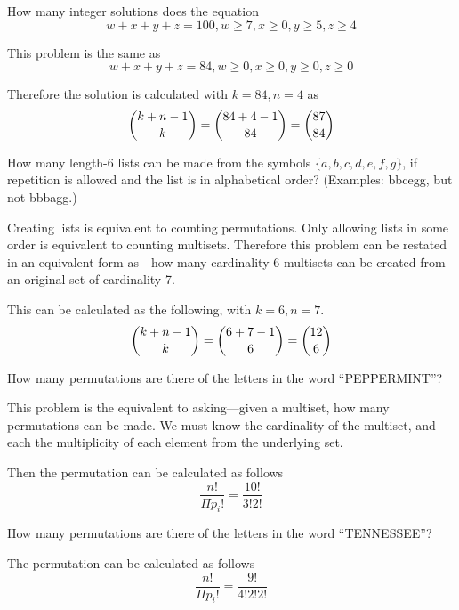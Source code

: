 \documentclass[openany, 11pt]{book}
\begin{document}
\begin{exercise}{}{}
	How many integer solutions does the equation
	$$w + x + y+ z = 100, w \geq 7, x \geq 0, y \geq 5, z \geq 4$$
	\begin{alist}
		\item This problem is the same as
		$$w + x + y+ z = 84, w \geq 0, x \geq 0, y \geq 0, z \geq 0$$
		\item Therefore the solution is calculated with $k=84, n=4$ as
		$$ \dbinom{k+n-1}{k} = \dbinom{84+4-1}{84}=\dbinom{87}{84}$$
	\end{alist}
\end{exercise}

\begin{exercise}{}{}
	How many length-6 lists can be made from the symbols $\{a,
		b, c, d, e, f, g\}$, if repetition is allowed and the list is in
	alphabetical order? (Examples: bbcegg, but not bbbagg.)
	\begin{alist}
		\item Creating lists is equivalent to counting permutations. Only allowing lists
		in some order is equivalent to counting multisets. Therefore this problem
		can be restated in an equivalent form as---how many cardinality 6 multisets
		can be created from an original set of cardinality 7.
		\item This can be calculated as the following, with $k=6, n=7$.
		$$ \dbinom{k+n-1}{k} = \dbinom{6+7-1}{6}=\dbinom{12}{6}$$
	\end{alist}
\end{exercise}

\begin{exercise}{}{}
	How many permutations are there of the letters in the word “PEPPERMINT”?
	\begin{alist}
		\item This problem is the equivalent to asking---given a multiset, how many
		permutations can be made.  We must know the cardinality of the multiset, and each
		the multiplicity of each element from the underlying set.
		\item Then the permutation can be calculated as follows
		$$ \dfrac{n!}{\Pi{p_i}!} = \dfrac{10!}{3!2!}$$
	\end{alist}
\end{exercise}

\begin{exercise}{}{}
	How many permutations are there of the letters in the word “TENNESSEE”?
	\begin{alist}
		\item The permutation can be calculated as follows $$
			\dfrac{n!}{\Pi{p_i}!} = \dfrac{9!}{4!2!2!}$$
	\end{alist}
\end{exercise}
\end{document}
